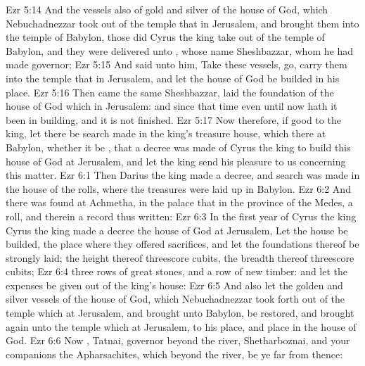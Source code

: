\vs Ezr 5:14 And the vessels also of gold and silver of the house of God, which Nebuchadnezzar took out of the temple that  in Jerusalem, and brought them into the temple of Babylon, those did Cyrus the king take out of the temple of Babylon, and they were delivered unto , whose name  Sheshbazzar, whom he had made governor;
\vs Ezr 5:15 And said unto him, Take these vessels, go, carry them into the temple that  in Jerusalem, and let the house of God be builded in his place.
\vs Ezr 5:16 Then came the same Sheshbazzar,  laid the foundation of the house of God which  in Jerusalem: and since that time even until now hath it been in building, and  it is not finished.
\vs Ezr 5:17 Now therefore, if  good to the king, let there be search made in the king's treasure house, which  there at Babylon, whether it be , that a decree was made of Cyrus the king to build this house of God at Jerusalem, and let the king send his pleasure to us concerning this matter.
\vs Ezr 6:1 Then Darius the king made a decree, and search was made in the house of the rolls, where the treasures were laid up in Babylon.
\vs Ezr 6:2 And there was found at Achmetha, in the palace that  in the province of the Medes, a roll, and therein  a record thus written:
\vs Ezr 6:3 In the first year of Cyrus the king  Cyrus the king made a decree  the house of God at Jerusalem, Let the house be builded, the place where they offered sacrifices, and let the foundations thereof be strongly laid; the height thereof threescore cubits,  the breadth thereof threescore cubits;
\vs Ezr 6:4  three rows of great stones, and a row of new timber: and let the expenses be given out of the king's house:
\vs Ezr 6:5 And also let the golden and silver vessels of the house of God, which Nebuchadnezzar took forth out of the temple which  at Jerusalem, and brought unto Babylon, be restored, and brought again unto the temple which  at Jerusalem,  to his place, and place  in the house of God.
\vs Ezr 6:6 Now , Tatnai, governor beyond the river, Shetharboznai, and your companions the Apharsachites, which  beyond the river, be ye far from thence:
